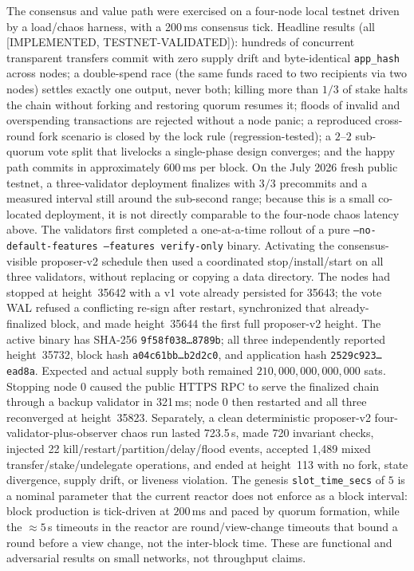 \documentclass[11pt]{article}
\newcommand{\code}[1]{\texttt{#1}}
\newcommand{\statusV}{\textcolor{statgreen}{\textsf{\scriptsize[IMPLEMENTED, TESTNET-VALIDATED]}}}
\theoremstyle{plain}
\theoremstyle{definition}
\theoremstyle{remark}
\begin{document}
The consensus and value path were exercised on a four-node local testnet
driven by a load/chaos harness, with a 200\,ms consensus tick. Headline
results (all \statusV{}): hundreds of concurrent transparent transfers commit
with zero supply drift and byte-identical \code{app\_hash} across nodes; a
double-spend race (the same funds raced to two recipients via two nodes)
settles exactly one output, never both; killing more than $1/3$ of stake
halts the chain without forking and restoring quorum resumes it; floods of
invalid and overspending transactions are rejected without a node panic; a
reproduced cross-round fork scenario is closed by the lock rule
(regression-tested); a $2$--$2$ sub-quorum vote split that livelocks a
single-phase design converges; and the happy path commits in approximately
$600$\,ms per block. On the July 2026 fresh public testnet, a three-validator
deployment finalizes with $3/3$ precommits and a measured interval still around
the sub-second range; because this is a small co-located deployment, it is not
directly comparable to the four-node chaos latency above. The validators first
completed a one-at-a-time rollout of a pure
\code{--no-default-features --features verify-only} binary. Activating the
consensus-visible proposer-v2 schedule then used a coordinated stop/install/start
on all three validators, without replacing or copying a data directory. The
nodes had stopped at height~35642 with a v1 vote already persisted for 35643;
the vote WAL refused a conflicting re-sign after restart, synchronized that
already-finalized block, and made height~35644 the first full proposer-v2
height. The active binary has SHA-256 \code{9f58f038\ldots 8789b}; all three
independently reported height~35732, block hash
\code{a04c61bb\ldots b2d2c0}, and application hash
\code{2529c923\ldots ead8a}. Expected and actual supply both remained
$210{,}000{,}000{,}000{,}000$ sats. Stopping node 0 caused the public HTTPS RPC
to serve the finalized chain through a backup validator in 321\,ms; node 0 then
restarted and all three reconverged at height~35823. Separately, a clean
deterministic proposer-v2 four-validator-plus-observer chaos run lasted
723.5\,s, made 720 invariant checks, injected 22
kill/restart/partition/delay/flood events, accepted 1,489 mixed
transfer/stake/undelegate operations, and ended at height~113 with no fork,
state divergence, supply drift, or liveness violation. The genesis
\code{slot\_time\_secs} of $5$ is a nominal parameter that
the current reactor does not enforce as a block interval: block production is
tick-driven at $200$\,ms and paced by quorum formation, while the
$\approx 5$\,s timeouts in the reactor are round/view-change timeouts that bound
a round before a view change, not the inter-block time. These are functional
and adversarial results on small networks, not throughput claims.
\end{document}
